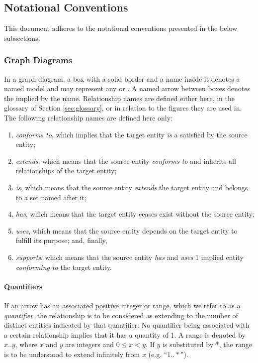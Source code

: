 \newpage

\subsection{Notational Conventions}
\label{sec:introduction:conventions}

This document adheres to the notational conventions presented in the below subsections.

\subsubsection{Graph Diagrams}
\label{sec:introduction:conventions:graphs}

In a graph diagram, a box with a solid border and a name inside it denotes a named model  and may represent any  or .
A named arrow between boxes denotes the  implied by the name.
Relationship names are defined either here, in the glossary of Section \ref{sec:glossary}, or in relation to the figures they are used in.
The following relationship names are defined here only:

\begin{enumerate}
\item \textit{conforms to}, which implies that the target entity \textit{is} a  satisfied by the source entity;
\item \textit{extends}, which means that the source entity \textit{conforms to} and inherits all relationships of the target entity;
\item \textit{is}, which means that the source entity \textit{extends} the target entity and belongs to a set named after it;
\item \textit{has}, which means that the target entity ceases exist without the source entity;
\item \textit{uses}, which means that the source entity depends on the target entity to fulfill its purpose;  and, finally,
\item \textit{supports}, which means that the source entity \textit{has} and \textit{uses} 1 implied entity \textit{conforming to} the target entity.
\end{enumerate}

\paragraph{Quantifiers}
If an arrow has an associated positive integer or range, which we refer to as a \textit{quantifier}, the relationship is to be considered as extending to the number of distinct entities indicated by that quantifier.
No quantifier being associated with a certain relationship implies that it has a quantity of 1.
A range is denoted by $x..y$, where $x$ and $y$ are integers and $0 \leq x < y$.
If $y$ is substituted by $*$, the range is to be understood to extend infinitely from $x$ (e.g. ``$1..*$'').

